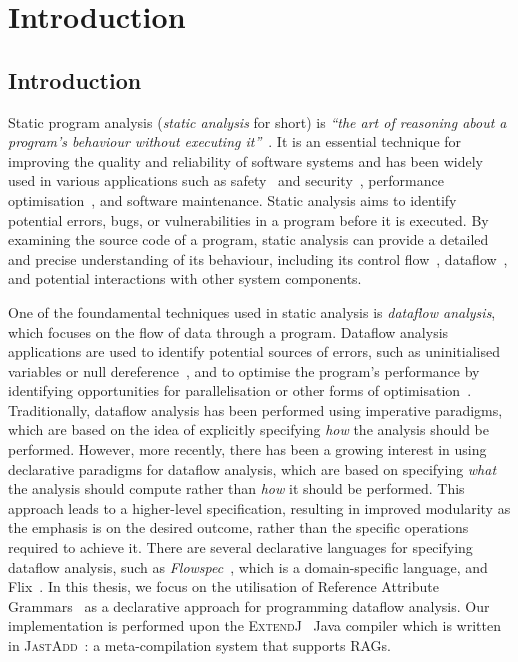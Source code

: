 \chapter{Introduction}
\section{Introduction}

Static program analysis (\emph{static analysis} for short) is
\emph{``the art of reasoning about a program's behaviour without executing it''}~\cite{spa}.
It is an essential technique for improving the quality and reliability of software
systems and has been widely used in various applications such
as safety~\cite{cousot2005astree,Blanchet2002} and security~\cite{piskachev2021secucheck,flowDroid,ayewah2008using,Sayar_2022,fink2012wala},
performance optimisation~\cite{aho2007compilers,appel2004modern}, and software maintenance.
Static analysis aims to identify potential errors, bugs, or vulnerabilities
in a program before it is executed.
By examining the source code of a program, static
analysis can provide a detailed and precise understanding of its behaviour, including
its control flow~\cite{allen1970control}, dataflow~\cite{kam1977monotone},
and potential interactions with other system components.



One of the foundamental techniques used in static analysis is \emph{dataflow analysis},
which focuses on the flow of data through a program. Dataflow analysis applications are used to identify
potential sources of errors, such as uninitialised variables or null dereference~\cite{khedker2017data},
and to optimise the program's performance by identifying opportunities for
parallelisation or other forms of optimisation~\cite{aho2007compilers}.
Traditionally, dataflow analysis has been performed using imperative paradigms,
which are based on the idea of explicitly specifying \emph{how} the analysis should be
performed.
However, more recently, there has been a growing interest in using
declarative paradigms for dataflow analysis, which are based on specifying \emph{what}
the analysis should compute rather than \emph{how} it should be performed.
This approach leads to a higher-level specification, resulting in improved modularity as
the emphasis is on the desired outcome, rather than the specific operations required to 
achieve it.
There are several declarative languages for specifying dataflow analysis, 
such as \emph{Flowspec}~\cite{smits2020flowspec}, which is a domain-specific language,
and Flix~\cite{madsen2016programming}. In this thesis, we focus on the utilisation of Reference 
Attribute Grammars~\cite{hedin2000rags} as a declarative approach for programming dataflow analysis. 
Our implementation is performed upon the \textsc{ExtendJ}~\cite{ekman2007jastadd} Java compiler
which is written in \textsc{JastAdd}~\cite{DBLP:journals/entcs/HedinM01}: a
meta-compilation system that supports RAGs.



